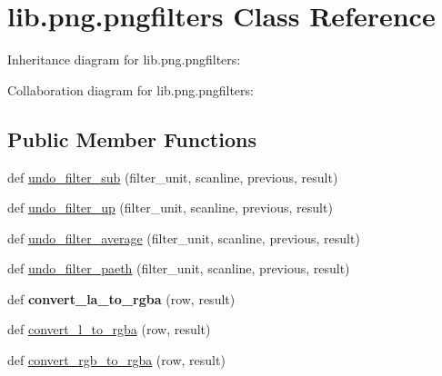 \hypertarget{classlib_1_1png_1_1pngfilters}{}\section{lib.\+png.\+pngfilters Class Reference}
\label{classlib_1_1png_1_1pngfilters}


Inheritance diagram for lib.\+png.\+pngfilters\+:


Collaboration diagram for lib.\+png.\+pngfilters\+:
\subsection*{Public Member Functions}
\begin{DoxyCompactItemize}
\item 
def \hyperlink{classlib_1_1png_1_1pngfilters_a1eff20a1be5ba15a4d4962e1b42a5ddf}{undo\+\_\+filter\+\_\+sub} (filter\+\_\+unit, scanline, previous, result)
\item 
def \hyperlink{classlib_1_1png_1_1pngfilters_a613d39b8fc531c20eb0c36c306caaee1}{undo\+\_\+filter\+\_\+up} (filter\+\_\+unit, scanline, previous, result)
\item 
def \hyperlink{classlib_1_1png_1_1pngfilters_acaf39bb72c89f32a2d1c5c5576f0a4cc}{undo\+\_\+filter\+\_\+average} (filter\+\_\+unit, scanline, previous, result)
\item 
def \hyperlink{classlib_1_1png_1_1pngfilters_a1645c56f7dac3c148f6bc2ad5abca3c7}{undo\+\_\+filter\+\_\+paeth} (filter\+\_\+unit, scanline, previous, result)
\item 
\mbox{\label{classlib_1_1png_1_1pngfilters_a1742e2da9812f10913f5a8894500741e}} 
def {\bfseries convert\+\_\+la\+\_\+to\+\_\+rgba} (row, result)
\item 
def \hyperlink{classlib_1_1png_1_1pngfilters_a0f615feb0f94ccc797312504f0603f92}{convert\+\_\+l\+\_\+to\+\_\+rgba} (row, result)
\item 
def \hyperlink{classlib_1_1png_1_1pngfilters_acf18eebe594a4c9a53bafb28932d280e}{convert\+\_\+rgb\+\_\+to\+\_\+rgba} (row, result)
\end{DoxyCompactItemize}
